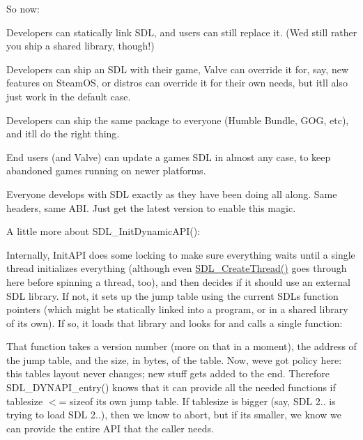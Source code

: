 So now\+:
\begin{DoxyItemize}
\item Developers can statically link SDL, and users can still replace it. (We\textquotesingle{}d still rather you ship a shared library, though!)
\item Developers can ship an SDL with their game, Valve can override it for, say, new features on Steam\+OS, or distros can override it for their own needs, but it\textquotesingle{}ll also just work in the default case.
\item Developers can ship the same package to everyone (Humble Bundle, GOG, etc), and it\textquotesingle{}ll do the right thing.
\item End users (and Valve) can update a game\textquotesingle{}s SDL in almost any case, to keep abandoned games running on newer platforms.
\item Everyone develops with SDL exactly as they have been doing all along. Same headers, same ABI. Just get the latest version to enable this magic.
\end{DoxyItemize}

A little more about SDL\+\_\+\+Init\+Dynamic\+API()\+:

Internally, Init\+API does some locking to make sure everything waits until a single thread initializes everything (although even \mbox{\hyperlink{_s_d_l__thread_8h_ac36c70a33975a8c9399962f8ac310377}{SDL\+\_\+\+Create\+Thread()}} goes through here before spinning a thread, too), and then decides if it should use an external SDL library. If not, it sets up the jump table using the current SDL\textquotesingle{}s function pointers (which might be statically linked into a program, or in a shared library of its own). If so, it loads that library and looks for and calls a single function\+:


\begin{DoxyCode}{0}

\end{DoxyCode}


That function takes a version number (more on that in a moment), the address of the jump table, and the size, in bytes, of the table. Now, we\textquotesingle{}ve got policy here\+: this table\textquotesingle{}s layout never changes; new stuff gets added to the end. Therefore SDL\+\_\+\+DYNAPI\+\_\+entry() knows that it can provide all the needed functions if tablesize \texorpdfstring{$<$}{<}= sizeof its own jump table. If tablesize is bigger (say, SDL 2.. is trying to load SDL 2..), then we know to abort, but if it\textquotesingle{}s smaller, we know we can provide the entire API that the caller needs.


